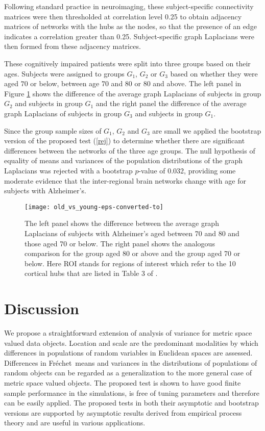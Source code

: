 \documentclass[lineno]{biometrika}
\def\cp{\citep}
\def\cp{\citep}
\def\F{Fr\'{e}chet}
\begin{document}
Following standard practice in neuroimaging, these 
subject-specific connectivity matrices were then thresholded at correlation level 0.25 \cp{buck:09} to obtain adjacency matrices of networks with the hubs as the nodes, so that the presence of an edge indicates a  correlation greater than 0.25. Subject-specific graph Laplacians were then formed from these adjacency matrices.

These cognitively impaired patients were split into three groups based on their ages. Subjects were assigned to groups $G_1$, $G_2$ or $G_3$ based on whether they were aged $70$ or below, between age 70 and $80$ or $80$ and above. The left panel in Figure \ref{fig:fig_14} shows the difference of the average graph Laplacians of subjects in group $G_2$ and subjects in group $G_1$ and the right panel the difference of the average graph Laplacians of subjects in group $G_3$ and subjects in group $G_1$.

Since the group sample sizes of $G_1$, $G_2$ and $G_3$ are small we applied the bootstrap version of the proposed  test (\ref{rej}) to determine whether there  are  significant differences between the networks of the three age groups. The null hypothesis of equality of means and variances of the population distributions of the graph Laplacians was rejected with a bootstrap $p$-value of 0.032, providing some moderate evidence that the inter-regional brain  networks change with  age for subjects with Alzheimer's. 


\begin{figure}
	\centering
	\texttt{[image: old\_vs\_young-eps-converted-to]}
	\caption{The left panel shows the difference between the average graph Laplacians of subjects with Alzheimer's aged between 70 and 80 and those aged 70 or below. The right panel shows the analogous comparison  for the group aged 80 or above and the group aged 70 or below. Here ROI stands for regions of interest which refer to the 10 cortical hubs that are listed  in Table 3 of \cite{buck:09}. }
	\label{fig:fig_14}
\end{figure}

\section{Discussion}
We propose a  straightforward extension of analysis of variance for metric space valued data objects. Location and scale are the predominant modalities by which differences in populations of random variables in Euclidean spaces are assessed.  Differences in \F \ means and variances in the distributions of populations of random objects can be regarded as a generalization to the more general case of metric space valued objects. The proposed test is shown to have  good finite sample performance in the simulations, is free of tuning parameters and therefore can be easily applied. %
The proposed tests in both their asymptotic and  bootstrap versions are supported by asymptotic results  derived from empirical process theory and are useful in various applications.  
\end{document}
